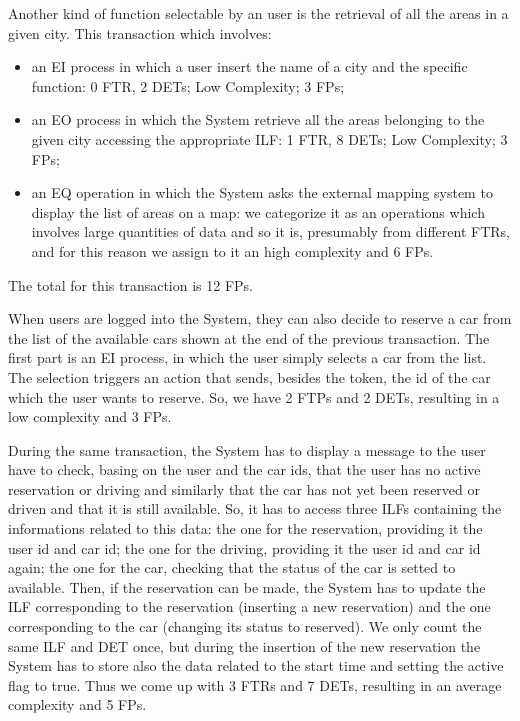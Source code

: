 Another kind of function selectable by an user is the retrieval of all the areas in a given city. This transaction which involves:
\begin{itemize}
	\item an EI process in which a user insert the name of a city and the specific function: 0 FTR, 2 DETs; Low Complexity; 3 FPs;
	\item an EO process in which the System retrieve all the areas belonging to the given city accessing the appropriate ILF: 1 FTR, 8 DETs; Low Complexity; 3 FPs;
	\item an EQ operation in which the System asks the external mapping system to display the list of areas on a map: we categorize it as an operations which involves large quantities of data and so it is, presumably from different FTRs, and for this reason we assign to it an high complexity and 6 FPs.
\end{itemize}
The total for this transaction is 12 FPs. 
\bigskip

When users are logged into the System, they can also decide to reserve a car from the list of the available cars shown at the end of the previous transaction.
The first part is an EI process, in which the user simply selects a car from the list. The selection triggers an action that sends, besides the token, the id of the car which the user wants to reserve. So, we have 2 FTPs and 2 DETs, resulting in a low complexity and 3 FPs.

During the same transaction, the System has to display a message to the user have to check, basing on the user and the car ids, that the user has no active reservation or driving and similarly that the car has not yet been reserved or driven and that it is still available. So, it has to access three ILFs containing the informations related to this data: the one for the reservation, providing it the user id and car id; the one for the driving, providing it the user id and car id again; the one for the car, checking that the status of the car is setted to available. Then, if the reservation can be made, the System has to update the ILF corresponding to the reservation (inserting a new reservation) and the one corresponding to the car (changing its status to reserved). We only count the same ILF and DET once, but during the insertion of the new reservation the System has to store also the data related to the start time and setting the active flag to true. Thus we come up with 3 FTRs and 7 DETs, resulting in an average complexity and 5 FPs.

